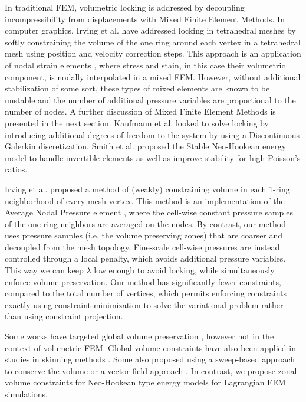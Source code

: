 In traditional FEM, volumetric locking is addressed by decoupling incompressibility from displacements with Mixed Finite Element Methods. 
In computer graphics, Irving et al.  have addressed locking in tetrahedral meshes by
softly constraining the volume of the one ring around each vertex in a tetrahedral mesh using position
and velocity correction steps. This approach is an application of nodal strain elements \cite{bonet:1998},
where stress and stain, in this case their volumetric component, is nodally interpolated in a mixed FEM. 
However, without additional stabilization of some sort, these types of mixed elements are known to be unstable 
and the number of additional pressure variables are proportional to the number of nodes.
A further discussion of Mixed Finite Element Methods is presented in the next section.
Kaufmann et al.  looked to solve locking by introducing additional degrees of freedom 
to the system by using a Discontinuous Galerkin discretization. Smith et al.  proposed 
the Stable Neo-Hookean energy model to handle invertible elements as well as improve stability for high Poisson's ratios.

Irving et al.  proposed a method of (weakly) constraining volume in
each 1-ring neighborhood of every mesh vertex. This method is an implementation of the 
Average Nodal Pressure element \cite{bonet:1998}, where the cell-wise constant pressure samples of the
one-ring neighbors are averaged on the nodes. By contrast, our method uses pressure samples
(i.e. the volume preserving zones) that are coarser and decoupled from the mesh topology.
Fine-scale cell-wise pressures are instead controlled through a local penalty, which avoids
additional pressure variables.  This way we can keep $\lambda$ low enough to
avoid locking, while simultaneously enforce volume preservation.
Our method has significantly fewer constraints, compared to the total number of vertices, which
permits enforcing constraints exactly using constraint minimization to
solve the variational problem rather than using constraint projection.

Some works have targeted global volume preservation
\cite{Hong:2006,Hirota:2000,Promayon:1996,Diziol:2011}, however not in the context of volumetric
FEM.  Global volume constraints have also been applied in studies in skinning methods
\cite{Rohmer:2009}. Some also proposed using a sweep-based approach to conserve the volume
\cite{Yoon:2006,Angelidi:2004} or a vector field approach \cite{Funck:2007}. In contrast, we propose
zonal volume constraints for Neo-Hookean type energy models for Lagrangian FEM simulations.

